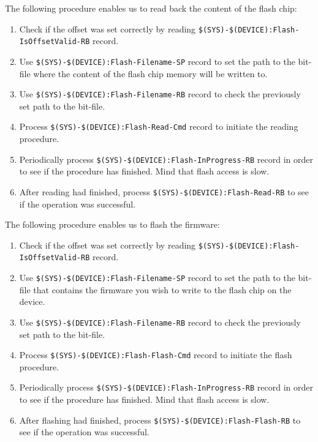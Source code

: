 \documentclass[12pt,a4paper]{article}
\begin{document}
The following procedure enables us to read back the content of the flash chip:
\begin{enumerate}
	\item Check if the offset was set correctly by reading \newline\texttt{\$(SYS)-\$(DEVICE):Flash-IsOffsetValid-RB} record.
	\item Use \texttt{\$(SYS)-\$(DEVICE):Flash-Filename-SP} record to set the path to the bit-file where the content of the flash chip memory will be written to.
	\item Use \texttt{\$(SYS)-\$(DEVICE):Flash-Filename-RB} record to check the previously set path to the bit-file.
	\item Process \texttt{\$(SYS)-\$(DEVICE):Flash-Read-Cmd} record to initiate the reading procedure. 
	\item Periodically process \texttt{\$(SYS)-\$(DEVICE):Flash-InProgress-RB} record in order to see if the procedure has finished. Mind that flash access is slow.
	\item After reading had finished, process \texttt{\$(SYS)-\$(DEVICE):Flash-Read-RB} to see if the operation was successful.
\end{enumerate}

The following procedure enables us to flash the firmware:
\begin{enumerate}
	\item Check if the offset was set correctly by reading \newline\texttt{\$(SYS)-\$(DEVICE):Flash-IsOffsetValid-RB} record.
	\item Use \texttt{\$(SYS)-\$(DEVICE):Flash-Filename-SP} record to set the path to the bit-file that contains the firmware you wish to write to the flash chip on the device.
	\item Use \texttt{\$(SYS)-\$(DEVICE):Flash-Filename-RB} record to check the previously set path to the bit-file.
	\item Process \texttt{\$(SYS)-\$(DEVICE):Flash-Flash-Cmd} record to initiate the flash procedure. 
	\item Periodically process \texttt{\$(SYS)-\$(DEVICE):Flash-InProgress-RB} record in order to see if the procedure has finished. Mind that flash access is slow.
	\item After flashing had finished, process \texttt{\$(SYS)-\$(DEVICE):Flash-Flash-RB} to see if the operation was successful.
\end{enumerate}
\end{document}

